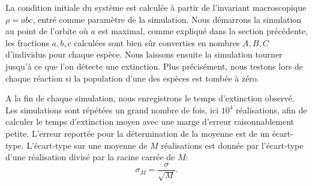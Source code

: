 \documentclass[openany,a4paper,12pt]{article}
\begin{document}
\par La condition initiale du système est calculée à partir de l'invariant macroscopique $\rho=abc$, entré comme paramètre de la simulation. Nous démarrons la simulation au point de l'orbite où $a$ est maximal, comme expliqué dans la section précédente, les fractions $a,b,c$ calculées sont bien sûr converties en nombres $A,B,C$ d'individus pour chaque espèce. Nous laissons ensuite la simulation tourner jusqu'à ce que l'on détecte une extinction. Plus précisément, nous testons lors de chaque réaction si la population d'une des espèces est tombée à zéro.

\par A la fin de chaque simulation, nous enregistrons le temps d'extinction observé. Les simulations sont répétées un grand nombre de fois, ici $10^4$ réalisations, afin de calculer le temps d'extinction moyen avec une marge d'erreur raisonnablement petite. L'erreur reportée pour la détermination de la moyenne est de un écart-type. L'écart-type sur une moyenne de $M$ réalisations est donnée par l'écart-type d'une réalisation divisé par la racine carrée de $M$:
%
\begin{equation}\label{gillespie_err_moyenne}
	\sigma_M = \frac{\sigma}{\sqrt{M}}.
\end{equation}
%


		
\printbibliography
\end{document}

